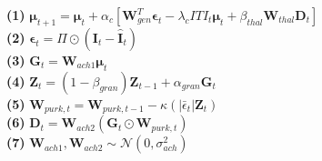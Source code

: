 \documentclass{article}
\begin{document}
\begin{center}

\vspace{0.5cm}
\begin{minipage}{\linewidth}
\scriptsize
\textbf{(1)} $\boldsymbol{\mu}_{t+1} = \boldsymbol{\mu}_{t} + \alpha_{c} \left[\mathbf{W}^{T}_{gen} \boldsymbol{\epsilon}_{t} - \lambda_{c} ITI_{t} \boldsymbol{\mu}_{t} + \beta_{thal} \mathbf{W}_{thal} \mathbf{D}_{t}\right]$ \\[0.5ex]
\textbf{(2)} $\boldsymbol{\epsilon}_{t} = \Pi \odot (\mathbf{I}_{t} - \hat{\mathbf{I}}_{t})$ \\[0.5ex]
\textbf{(3)} $\mathbf{G}_{t} = \mathbf{W}_{ach1} \boldsymbol{\mu}_{t}$ \\[0.5ex]
\textbf{(4)} $\mathbf{Z}_{t} = (1 - \beta_{gran}) \mathbf{Z}_{t-1} + \alpha_{gran} \mathbf{G}_{t}$ \\[0.5ex]
\textbf{(5)} $\mathbf{W}_{purk, t} = \mathbf{W}_{purk, t-1} - \kappa ( \left| \bar{\epsilon}_{t} \right| \mathbf{Z}_{t})$ \\[0.5ex]
\textbf{(6)} $\mathbf{D}_{t} = \mathbf{W}_{ach2} (\mathbf{G}_{t} \odot \mathbf{W}_{purk, t})$ \\[0.5ex]
\textbf{(7)} $\mathbf{W}_{ach1}, \mathbf{W}_{ach2} \sim \mathcal{N}(0, \sigma_{ach}^2)$
\end{minipage}
\end{center}
\end{document}
